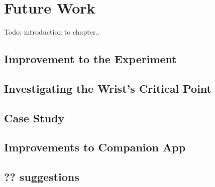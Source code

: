 \chapter{Future Work}

Todo: introduction to chapter.. 

\section{Improvement to the Experiment}

\section{Investigating the Wrist's Critical Point}

\section{Case Study}

\section{Improvements to Companion App}

\section{?? suggestions}